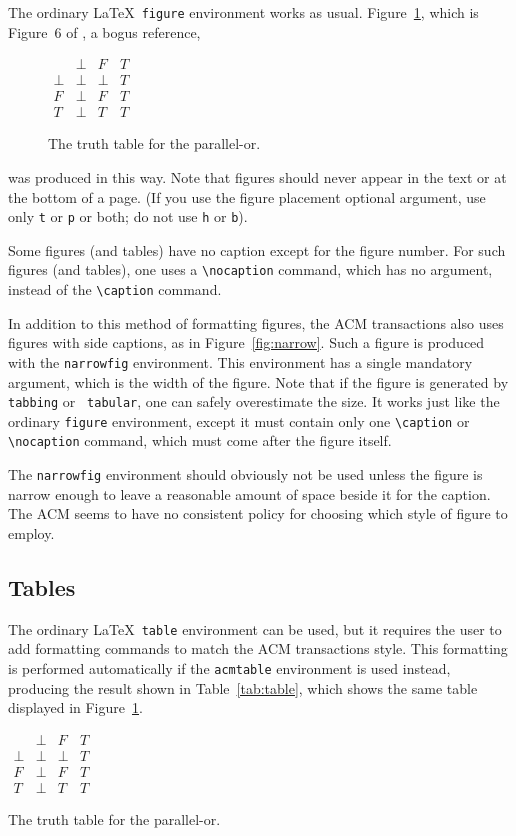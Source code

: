 \documentclass[hyperref]{acmtrans2e}
\begin{document}
The ordinary \LaTeX\ {\tt figure} environment works as usual.
Figure~\ref{fig:ordinary}, which is Figure~6 of , a bogus reference,
\begin{figure}
\centering
\(\begin{array}{c|ccc}
     & \bot & F & T \\
\hline
\bot & \bot & \bot & T \\
F    & \bot & F    & T \\
T    & \bot & T    & T
\end{array}\)
\caption{The truth table for the parallel-or.}
\label{fig:ordinary}
\end{figure}
was produced in this way.
Note that figures should never appear in the text or at the bottom of
a page. (If you use the figure placement optional argument, use only
\verb"t" or \verb"p" or both; do not use \verb"h" or \verb"b").

Some figures (and tables) have no caption except for the figure number.
For such figures (and tables), one uses a \verb|\nocaption| command,
which has no argument, instead of the \verb|\caption| command.

In addition to this method of formatting figures, the ACM transactions
also uses figures with side captions, as in Figure~\ref{fig:narrow}.
Such a figure is produced with the {\tt narrowfig} environment.  This
environment has a single mandatory argument, which is the width of the
figure.
Note that if the figure is generated by {\tt tabbing} or {\tt
tabular}, one can safely overestimate the size.
It works just like the ordinary {\tt figure} environment,
except it must contain only one \verb|\caption| or \verb|\nocaption|
command, which must come after the figure itself.  

The {\tt narrowfig} environment should obviously not be used unless the
figure is narrow enough to leave a reasonable amount of space beside it
for the caption.  The ACM seems to have no consistent policy for choosing
which style of figure to employ.

\subsection{Tables}

The ordinary \LaTeX\ {\tt table} environment can be used, but it
requires the user to add formatting commands to match the ACM
transactions style.  This formatting is performed automatically
if the {\tt acmtable} environment is used instead, producing
the result shown in Table~\ref{tab:table}, which shows the same
table displayed in Figure~\ref{fig:ordinary}.
\begin{acmtable}{100pt}
\centering
\(\begin{array}{c|ccc}
     & \bot & F & T \\
\hline
\bot & \bot & \bot & T \\
F    & \bot & F    & T \\
T    & \bot & T    & T
\end{array}\)
\caption{The truth table for the parallel-or.}
\label{tab:table}
\end{acmtable}
\end{document}
